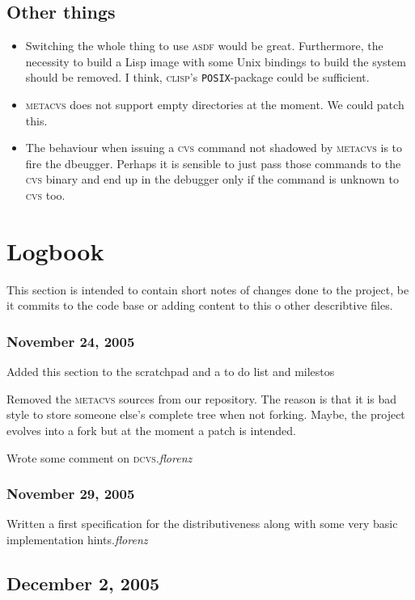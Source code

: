 \documentclass[fleqn, german, 10pt, a4paper]{article}
\begin{document}
\subsection{Other things}
\begin{itemize}
\item Switching the whole thing to use \textsc{asdf} would be great.
Furthermore, the necessity to build a Lisp image with some Unix bindings
to build the system should be removed. I think, \textsc{clisp}'s
\texttt{POSIX}-package could be sufficient.
\item \textsc{metacvs} does not support empty directories at the moment.
We could patch this.
\item The behaviour when issuing a \textsc{cvs} command not shadowed by
\textsc{metacvs} is to fire the dbeugger. Perhaps it is sensible to
just pass those commands to the \textsc{cvs} binary and end up in the debugger
only if the command is unknown to \textsc{cvs} too.
\end{itemize}

\section{Logbook}

This section is intended to contain short notes of changes done to the
project, be it commits to the code base or adding content to this o
other describtive files.

\subsubsection*{November 24, 2005}
Added this section to the scratchpad and a to do list and milestos

Removed the \textsc{metacvs} sources from our repository. The reason is
that it is bad style to store someone else's complete tree when not forking.
Maybe, the project evolves into a fork but at the moment a patch is
intended.

Wrote some comment on \textsc{dcvs}.\hfill{\textit{florenz}}


\subsubsection*{November 29, 2005}

Written a first specification for the distributiveness along with some
very basic implementation hints.\hfill{\textit{florenz}}


\subsection*{December 2, 2005}
\end{document}
